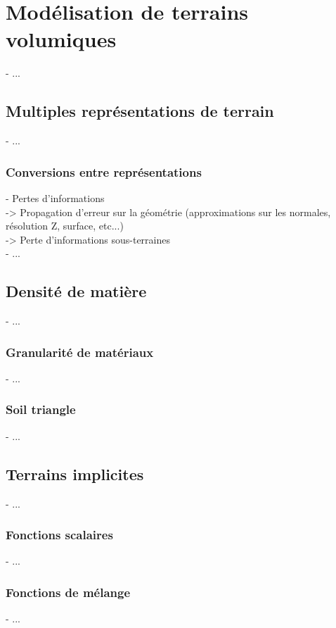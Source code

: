 \chapter{Modélisation de terrains volumiques}
\minitoc

- ...

\section{Multiples représentations de terrain}
- ...

\subsection{Conversions entre représentations}
- Pertes d'informations \\
-> Propagation d'erreur sur la géométrie (approximations sur les normales, résolution Z, surface, etc...) \\
-> Perte d'informations sous-terraines \\
- ...

\section{Densité de matière}
- ...

\subsection{Granularité de matériaux}
- ...

\subsection{Soil triangle}
- ...


\section{Terrains implicites}
- ...

\subsection{Fonctions scalaires}
- ...

\subsection{Fonctions de mélange}
- ...

